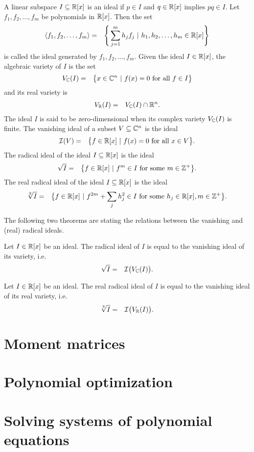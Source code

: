 A linear subspace $I \subseteq \mathbb{R}[x]$ is an ideal if $p\in I$ and $q\in\mathbb{R}[x]$ implies $pq \in I$.
Let $f_1, f_2, \ldots, f_m$ be polynomials in $\mathbb{R}[x]$. Then the set
\begin{eqnarray}
  \langle f_1, f_2, \ldots, f_m\rangle &=& \Bigg\{\sum_{j=1}^mh_jf_j\ |\ h_1, h_2, \ldots, h_m\in\mathbb{R}[x]\Bigg\}
\end{eqnarray}
is called the ideal generated by $f_1, f_2, \ldots, f_m$.
Given the ideal $I\in\mathbb{R}[x]$, the algebraic variety of $I$ is the set
\begin{eqnarray}
  V_{\mathbb{C}}(I) &=& \big\{x\in\mathbb{C}^n\ |\ f(x) = 0 \text{ for all } f\in I\big\}
\end{eqnarray}
and its real variety is
\begin{eqnarray}
  V_{\mathbb{R}}(I) &=& V_{\mathbb{C}}(I) \cap \mathbb{R}^n.
\end{eqnarray}
The ideal $I$ is said to be zero-dimensional when its complex variety $V_{\mathbb{C}}(I)$ is finite.
The vanishing ideal of a subset $V\subseteq\mathbb{C}^n$ is the ideal
\begin{eqnarray}
  \mathcal{I}(V) &=& \big\{f\in\mathbb{R}[x]\ |\ f(x) = 0 \text{ for all } x\in V\big\}.
\end{eqnarray}
The radical ideal of the ideal $I\subseteq \mathbb{R}[x]$ is the ideal
\begin{eqnarray}
  \sqrt{I} &=& \big\{f\in\mathbb{R}[x]\ |\ f^m\in I \text{ for some } m\in\mathbb{Z}^+\big\}.
\end{eqnarray}
The real radical ideal of the ideal $I\subseteq \mathbb{R}[x]$ is the ideal
\begin{eqnarray}
  \sqrt[\mathbb{R}]{I} &=& \big\{f\in\mathbb{R}[x]\ |\ f^{2m} + \sum_j h_j^2 \in I \text{ for some } h_j\in\mathbb{R}[x], m\in\mathbb{Z}^+\big\}.
\end{eqnarray}

The following two theorems are stating the relations between the vanishing and (real) radical ideals.

\begin{theorem}
  Let $I\in\mathbb{R}[x]$ be an ideal. The radical ideal of $I$ is equal to the vanishing ideal of its variety, i.e.\
  \begin{eqnarray}
    \sqrt{I} &=& \mathcal{I}\big(V_{\mathbb{C}}(I)\big).
  \end{eqnarray}
\end{theorem}

\begin{theorem}
  Let $I\in\mathbb{R}[x]$ be an ideal. The real radical ideal of $I$ is equal to the vanishing ideal of its real variety, i.e.\
  \begin{eqnarray}
    \sqrt[\mathbb{R}]{I} &=& \mathcal{I}\big(V_{\mathbb{R}}(I)\big).
  \end{eqnarray}
\end{theorem}

\section{Moment matrices}

\section{Polynomial optimization}

\section{Solving systems of polynomial equations}
